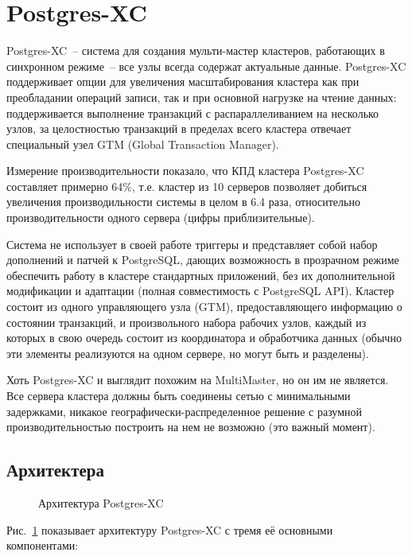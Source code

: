 \section{Postgres-XC}
\label{sec:postgres-xc}

Postgres-XC~-- система для создания мульти-мастер кластеров, работающих в синхронном режиме~-- все узлы всегда содержат актуальные данные. Postgres-XC поддерживает опции для увеличения масштабирования кластера как при преобладании операций записи, так и при основной нагрузке на чтение данных: поддерживается выполнение транзакций с распараллеливанием на несколько узлов, за целостностью транзакций в пределах всего кластера отвечает специальный узел GTM (Global Transaction Manager).

Измерение производительности показало, что КПД кластера Postgres-XC составляет примерно 64\%, т.е. кластер из 10 серверов позволяет добиться увеличения производильности системы в целом в 6.4 раза, относительно производительности одного сервера (цифры приблизительные). 

Система не использует в своей работе триггеры и представляет собой набор дополнений и патчей к PostgreSQL, дающих возможность в прозрачном режиме обеспечить работу в кластере стандартных приложений, без их дополнительной модификации и адаптации (полная совместимость с PostgreSQL API). Кластер состоит из одного управляющего узла (GTM), предоставляющего информацию о состоянии транзакций, и произвольного набора рабочих узлов, каждый из которых в свою очередь состоит из координатора и обработчика данных (обычно эти элементы реализуются на одном сервере, но могут быть и разделены).

Хоть Postgres-XC и выглядит похожим на MultiMaster, но он им не является. Все сервера кластера должны быть соединены сетью с минимальными задержками, никакое географически-распределенное решение с разумной производительностью построить на нем не возможно (это важный момент).

\subsection{Архитектера}

\begin{figure}[ht!]
  \caption{Архитектура Postgres-XC}
  \label{fig:postgres-xc1}
\end{figure}

Рис.~\ref{fig:postgres-xc1} показывает архитектуру Postgres-XC с тремя её основными компонентами:

